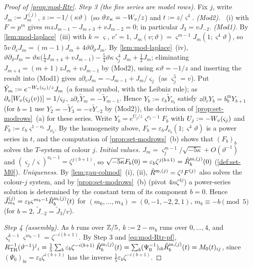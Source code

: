 \begin{proof}[Proof of \cref{prop:mod-Rtr}]
\emph{Step 3 (the five series are model rows).} Fix $j$, write $J_m:=J^{(j)}_m$, $z:=-1/(\kappa\vartheta)$ (so $\vartheta x_\kappa=-W_{v}/z$) and $t:=z/\varsigma^4$. \emph{(Mod2).} ~(i) with $F=p^m$ gives $mzJ_{m-1}-J_{m+3}+vJ_{m-2}=0$; in particular $J_3=vJ_{-2}$. \emph{(Mod1).} By \cref{lem:mod-laplace}~(iii) with $k=\varsigma$, $v'=1$, $J_m(v;\vartheta)=\varsigma^{m-1}J_m(1;\varsigma^4\vartheta)$, so $5v\,\partial_vJ_m=(m-1)J_m+4\vartheta\partial_\vartheta J_m$. By \cref{lem:mod-laplace}~(iv), $\vartheta\partial_\vartheta J_m=\vartheta\kappa\big(\tfrac14J_{m+4}+vJ_{m-1}\big)-\tfrac54\vartheta\kappa\varsigma_j^4J_m+\tfrac12J_m$; eliminating $J_{m+4}=(m+1)zJ_m+vJ_{m-1}$ by (Mod2), using $\kappa\vartheta=-1/z$ and inserting the result into (Mod1) gives $z\partial_vJ_m=-J_{m-1}+J_m/\varsigma_j$ (as $\varsigma_j^5=v$). Put $\tilde Y_m:=e^{-W_{v}(\varsigma_j)/z}J_m$ (a formal symbol, with the Leibniz rule); as $\partial_v[W_{v}(\varsigma_j(v))]=1/\varsigma_j$, $z\partial_v\tilde Y_m=-\tilde Y_{m-1}$. Hence $Y_b:=\varepsilon_b\tilde Y_{\nu_b}$ satisfy $z\partial_vY_b=b^{\mathrm m}_bY_{b+1}$ (for $b=1$ use $Y_2=-\tilde Y_3=-v\tilde Y_{-2}$ by (Mod2)), the derivation of \cref{prop:set-modrows}~(a) for these series. Write $Y_b=e^{U_j/z}\varsigma^{\nu_b-1}F_b$ with $U_j:=-W_{v}(\varsigma_j)$ and $F_b:=\varepsilon_b\varsigma^{1-\nu_b}J_{\nu_b}$. By the homogeneity above, $F_b=\varepsilon_bJ_{\nu_b}(1;\varsigma^4\vartheta)$ is a power series in $t$, and the computation of \cref{prop:set-modrows}~(b) shows that $(F_b)_b$ solves the $T$-system of colour $j$. \emph{Initial values.} $J_m=\varsigma_j^{m-1}/\sqrt{-5\kappa}+O(\vartheta^{-1})$ and $(\varsigma_j/\varsigma)^{\nu_b-1}=\zeta^{j(b+1)}$, so $\sqrt{-5\kappa}F_b(0)=\varepsilon_b\zeta^{j(b+1)}=\hat{R}^{\mathrm m,(j)}_b(0)$ (\cref{def:set-M0}). \emph{Uniqueness.} By \cref{lem:gau-colmod}~(i), (ii), $\hat{R}^{\mathrm m,(j)}=\zeta^jF^{(j)}$ also solves the colour-$j$ system, and by \cref{prop:set-modrows}~(b) (pivot $4n\zeta^{4j}$) a power-series solution is determined by the constant term of its component $b=0$. Hence $\tilde J^{(j)}_{m_b}=\varepsilon_b\varsigma^{m_b-1}\hat{R}^{\mathrm m,(j)}_b(t)$ for $(m_0,\dots,m_4)=(0,-1,-2,2,1)$, $m_b\equiv -b\pmod 5$ (for $b=2$, $\tilde J_{-2}=\tilde J_3/v$).

\emph{Step 4 (assembly).} As $b$ runs over $\mathbb{Z}/5$, $k:=2-m_b$ runs over $0,\dots,4$, and $\varsigma_i^{k-1}\varsigma^{m_b-1}=\zeta^{-i(b+1)}$. By Step 3 and \eqref{eq:mod-Rtr-pf}, $R_{\mathrm{TR}}^{-1}(\vartheta^{-1})^j{}_i=\frac15\sum_b\varepsilon_b\zeta^{-i(b+1)}\,\hat{R}^{\mathrm m,(j)}_b(t)=\sum_b(\Psi_0^{-1})_{ib}\hat{R}^{\mathrm m,(j)}_b(t)=M_{0}(t)_{ij}$, since $(\Psi_0)_{bi}=\varepsilon_b\zeta^{i(b+1)}$ has the inverse $\frac15\varepsilon_b\zeta^{-i(b+1)}$.


\end{proof}
